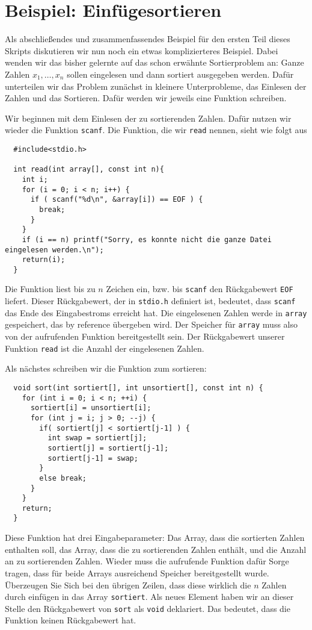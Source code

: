 \section{Beispiel: Einfügesortieren}

Als abschließendes und zusammenfassendes Beispiel für den ersten Teil dieses Skripts diskutieren wir nun noch ein etwas komplizierteres Beispiel.
Dabei wenden wir das bisher gelernte auf das schon erwähnte Sortierproblem an:
Ganze Zahlen $x_1, \ldots, x_n$ sollen eingelesen und dann sortiert ausgegeben werden.
Dafür unterteilen wir das Problem zunächst in kleinere Unterprobleme, das Einlesen der Zahlen und das Sortieren.
Dafür werden wir jeweils eine Funktion schreiben.

Wir beginnen mit dem Einlesen der zu sortierenden Zahlen.
Dafür nutzen wir wieder die Funktion \verb|scanf|.
Die Funktion, die wir \verb|read| nennen, sieht wie folgt aus
\begin{lstlisting}
  #include<stdio.h>

  int read(int array[], const int n){
    int i;
    for (i = 0; i < n; i++) {
      if ( scanf("%d\n", &array[i]) == EOF ) {
        break;
      }
    }
    if (i == n) printf("Sorry, es konnte nicht die ganze Datei eingelesen werden.\n");
    return(i);
  }
\end{lstlisting}
Die Funktion liest bis zu $n$ Zeichen ein, bzw. bis \verb|scanf| den Rückgabewert \verb|EOF| liefert.
Dieser Rückgabewert, der in \verb|stdio.h| definiert ist, bedeutet, dass \verb|scanf| das Ende des Eingabestroms erreicht hat.
Die eingelesenen Zahlen werde in \verb|array| gespeichert, das by reference übergeben wird.
Der Speicher für \verb|array| muss also von der aufrufenden Funktion bereitgestellt sein.
Der Rückgabewert unserer Funktion \verb|read| ist die Anzahl der eingelesenen Zahlen.

Als nächstes schreiben wir die Funktion zum sortieren:
\begin{lstlisting}
  void sort(int sortiert[], int unsortiert[], const int n) {
    for (int i = 0; i < n; ++i) {
      sortiert[i] = unsortiert[i];
      for (int j = i; j > 0; --j) {
        if( sortiert[j] < sortiert[j-1] ) {
          int swap = sortiert[j];
          sortiert[j] = sortiert[j-1];
          sortiert[j-1] = swap;
        }
        else break;
      }
    }
    return;
  }
\end{lstlisting}
Diese Funktion hat drei Eingabeparameter: Das Array, dass die sortierten Zahlen enthalten soll, das Array, dass die zu sortierenden Zahlen enthält, und die Anzahl an zu sortierenden Zahlen.
Wieder muss die aufrufende Funktion dafür Sorge tragen, dass für beide Arrays ausreichend Speicher bereitgestellt wurde.
Überzeugen Sie Sich bei den übrigen Zeilen, dass diese wirklich die $n$ Zahlen durch einfügen in das Array \verb|sortiert|.
Als neues Element haben wir an dieser Stelle den Rückgabewert von \verb|sort| als \verb|void| deklariert. 
Das bedeutet, dass die Funktion keinen Rückgabewert hat.

